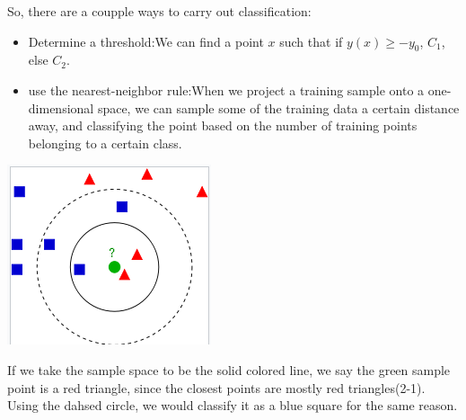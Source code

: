 \documentclass{tufte-handout}
\begin{document}
	So, there are a coupple ways to carry out classification:
	\begin{itemize}
			\item{Determine a threshold}:We can find a point $x$ such that if $y(x)\geq -y_{0}$,
					$C_{1}$, else $C_{2}$.
			\item{use the nearest-neighbor rule}:When we project a training sample onto a 
					one-dimensional space, we can sample some of the training data a certain 
					distance away, and classifying the point based on the number of training 
					points belonging to a certain class.
	\end{itemize}
	\begin{marginfigure}
			\includegraphics[width=\linewidth]{nearest_neighbors}
			\caption{If we take the sample space to be the solid colored line, we say the green
				sample point is a red triangle, since the closest points are mostly red triangles(2-1).
				Using the dahsed circle, we would classify it as a blue square for the same reason.}
	\end{marginfigure}
\end{document}
